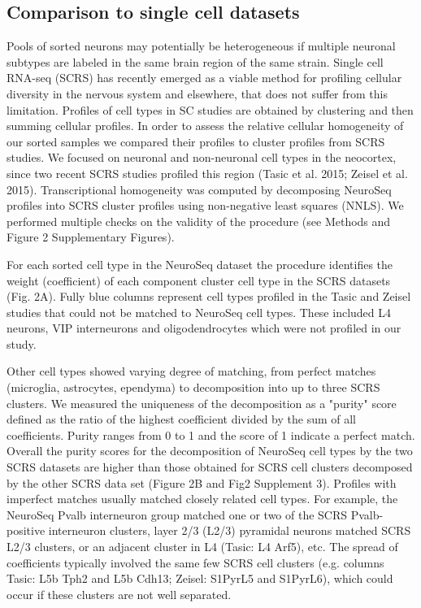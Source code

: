 \subsection{Comparison to single cell datasets}
Pools of sorted neurons may potentially be heterogeneous if multiple neuronal subtypes are labeled in the same brain region of the same strain. Single cell RNA-seq (SCRS) has recently emerged as a viable method for profiling cellular diversity in the nervous system and elsewhere, that does not suffer from this limitation. Profiles of cell types in SC studies are obtained by clustering and then summing cellular profiles. In order to assess the relative cellular homogeneity of our sorted samples we compared their profiles to cluster profiles from SCRS studies. We focused on neuronal and non-neuronal cell types in the neocortex, since two recent SCRS studies profiled this region (Tasic et al. 2015; Zeisel et al. 2015). Transcriptional homogeneity was computed by decomposing NeuroSeq profiles into SCRS cluster profiles using non-negative least squares (NNLS). We performed multiple checks on the validity of the procedure (see Methods and Figure 2 Supplementary Figures). 

For each sorted cell type in the NeuroSeq dataset the procedure identifies the weight (coefficient) of each component cluster cell type in the SCRS datasets (Fig. 2A). Fully blue columns represent cell types profiled in the Tasic and Zeisel studies that could not be matched to NeuroSeq cell types. These included L4 neurons, VIP interneurons and oligodendrocytes which were not profiled in our study. 

Other cell types showed varying degree of matching, from perfect matches (microglia, astrocytes, ependyma) to decomposition into up to three SCRS clusters. We measured the uniqueness of the decomposition as a "purity" score defined as the ratio of the highest coefficient divided by the sum of all coefficients. Purity ranges from 0 to 1 and the score of 1 indicate a perfect match. Overall the purity scores for the decomposition of NeuroSeq cell types by the two SCRS datasets are higher than those obtained for SCRS cell clusters decomposed by the other SCRS data set (Figure 2B and Fig2 Supplement 3). Profiles with imperfect matches usually matched closely related cell types. For example, the NeuroSeq Pvalb interneuron group matched one or two of the SCRS Pvalb-positive interneuron clusters, layer 2/3 (L2/3) pyramidal neurons matched SCRS L2/3 clusters, or an adjacent cluster in L4 (Tasic: L4 Arf5), etc. The spread of coefficients typically involved the same few SCRS cell clusters (e.g. columns Tasic: L5b Tph2 and L5b Cdh13; Zeisel: S1PyrL5 and S1PyrL6), which could occur if these clusters are not well separated. 

